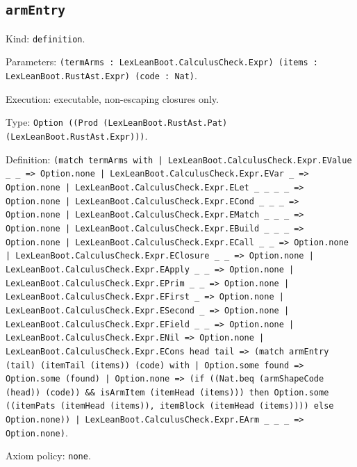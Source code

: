 \documentclass[11pt]{article}
\begin{document}
\subsection*{\texttt{armEntry}}
\noindent Kind: \texttt{definition}.\par
\noindent Parameters: \texttt{(termArms : LexLeanBoot.CalculusCheck.Expr) (items : LexLeanBoot.RustAst.Expr) (code : Nat)}.\par
\noindent Execution: executable, non-escaping closures only.\par
\noindent Type: \texttt{Option ((Prod (LexLeanBoot.RustAst.Pat) (LexLeanBoot.RustAst.Expr)))}.\par
\noindent Definition: \texttt{(match termArms with | LexLeanBoot.CalculusCheck.Expr.EValue \_ \_ => Option.none | LexLeanBoot.CalculusCheck.Expr.EVar \_ => Option.none | LexLeanBoot.CalculusCheck.Expr.ELet \_ \_ \_ \_ => Option.none | LexLeanBoot.CalculusCheck.Expr.ECond \_ \_ \_ => Option.none | LexLeanBoot.CalculusCheck.Expr.EMatch \_ \_ \_ => Option.none | LexLeanBoot.CalculusCheck.Expr.EBuild \_ \_ \_ => Option.none | LexLeanBoot.CalculusCheck.Expr.ECall \_ \_ => Option.none | LexLeanBoot.CalculusCheck.Expr.EClosure \_ \_ => Option.none | LexLeanBoot.CalculusCheck.Expr.EApply \_ \_ => Option.none | LexLeanBoot.CalculusCheck.Expr.EPrim \_ \_ => Option.none | LexLeanBoot.CalculusCheck.Expr.EFirst \_ => Option.none | LexLeanBoot.CalculusCheck.Expr.ESecond \_ => Option.none | LexLeanBoot.CalculusCheck.Expr.EField \_ \_ => Option.none | LexLeanBoot.CalculusCheck.Expr.ENil => Option.none | LexLeanBoot.CalculusCheck.Expr.ECons head tail => (match armEntry (tail) (itemTail (items)) (code) with | Option.some found => Option.some (found) | Option.none => (if ((Nat.beq (armShapeCode (head)) (code)) \&\& isArmItem (itemHead (items))) then Option.some ((itemPats (itemHead (items)), itemBlock (itemHead (items)))) else Option.none)) | LexLeanBoot.CalculusCheck.Expr.EArm \_ \_ \_ => Option.none)}.\par
\noindent Axiom policy: \texttt{none}.\par
\end{document}
